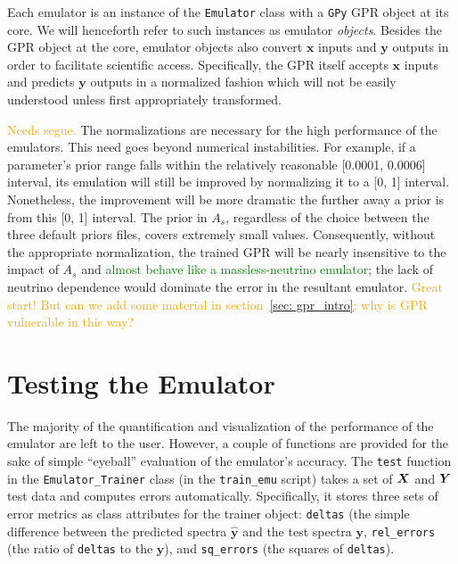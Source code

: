 Each emulator is an instance of
the \verb|Emulator| class with a \verb|GPy| GPR object at its core. We will 
henceforth refer to such instances as emulator \textit{objects}. Besides the 
GPR object at the core, emulator objects also convert $\bm{x}$ inputs and
$\bm{y}$ outputs in order to facilitate scientific access. Specifically, 
the GPR itself accepts $\bm{x}$ inputs and predicts $\bm{y}$ outputs 
in a normalized fashion which will not be easily understood unless first 
appropriately transformed.


\textcolor{orange}{Needs segue.}
The normalizations are necessary for the high performance of the emulators. 
This need goes beyond numerical instabilities. For example, if a parameter's 
prior range falls within the relatively reasonable [0.0001, 0.0006] interval, 
its emulation will still be improved by normalizing it to a [0, 1] interval. 
Nonetheless, the improvement will be more dramatic the further away a prior is 
from this [0, 1] interval. The prior in $A_s$, regardless of the choice
between the three default priors files, covers extremely small values. Consequently, 
without the appropriate normalization, the trained GPR will be nearly 
insensitive to the impact of $A_s$ and \textcolor{green}{almost behave like a 
massless-neutrino emulator}; the lack of neutrino dependence would dominate 
the error in the resultant emulator.
\textcolor{orange}{Great start! But can we add some material in
section~\ref{sec: gpr_intro}: why is GPR vulnerable in this way?}


\section{Testing the Emulator}
\label{test_emu}

The majority of the quantification and visualization of the performance of the
emulator are left to the user. However, a couple of functions are provided for 
the sake of simple ``eyeball'' evaluation of the emulator's accuracy.
The \verb|test| function in the \verb|Emulator_Trainer| class (in the
\verb|train_emu| script) takes a set of $\bm{X}$ and $\bm{Y}$ test data 
and computes errors automatically. Specifically, it stores three sets of error 
metrics as class attributes for the trainer object: \verb|deltas| (the simple 
difference between the predicted spectra $\hat{\bm{y}}$ and the test spectra
$\bm{y}$, \verb|rel_errors| (the ratio of \verb|deltas| to the $\bm{y}$), and
\verb|sq_errors| (the squares of \verb|deltas|).

